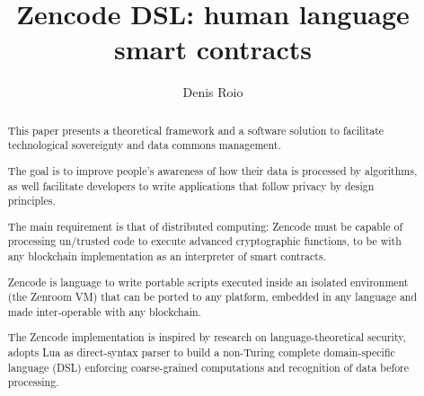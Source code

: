 \documentclass{svproc}
\begin{document}
\mainmatter              %
%
\title{Zencode DSL: human language smart contracts}
%
%
\author{Denis Roio}
%
%
%

\maketitle              %

\begin{abstract}

  This paper presents a theoretical framework and a software solution
  to facilitate technological sovereignty and data commons management.

  The goal is to improve people's awareness of how their data is
  processed by algorithms, as well facilitate developers to write
  applications that follow privacy by design principles.

  The main requirement is that of distributed computing: Zencode must
  be capable of processing un/trusted code to execute advanced
  cryptographic functions, to be with any blockchain implementation as
  an interpreter of smart contracts.

  Zencode is language to write portable scripts executed inside an
  isolated environment (the Zenroom VM) that can be ported to any
  platform, embedded in any language and made inter-operable with any
  blockchain.

  The Zencode implementation is inspired by research on
  language-theoretical security, adopts Lua as direct-syntax parser
  to build a non-Turing complete domain-specific language (DSL)
  enforcing coarse-grained computations and recognition of data before
  processing.

\end{abstract}
%
\end{document}
